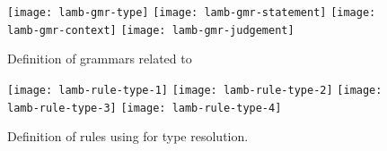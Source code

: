 \documentclass[master.tex]{subfiles}
\begin{document}
\begin{figure}[H]
    \centering
\begin{minipage}{0.7\textwidth}
    \texttt{[image: lamb-gmr-type]}
    \texttt{[image: lamb-gmr-statement]}
    \texttt{[image: lamb-gmr-context]}
    \texttt{[image: lamb-gmr-judgement]}
\end{minipage}
\caption{Definition of grammars related to }
\end{figure}


\begin{figure}[H]
    \centering
\begin{minipage}{0.7\textwidth}
    \texttt{[image: lamb-rule-type-1]}
    \texttt{[image: lamb-rule-type-2]}
    \texttt{[image: lamb-rule-type-3]}
    \texttt{[image: lamb-rule-type-4]}
\end{minipage}
\caption{Definition of rules using for type resolution.}
\end{figure}
\end{document}
